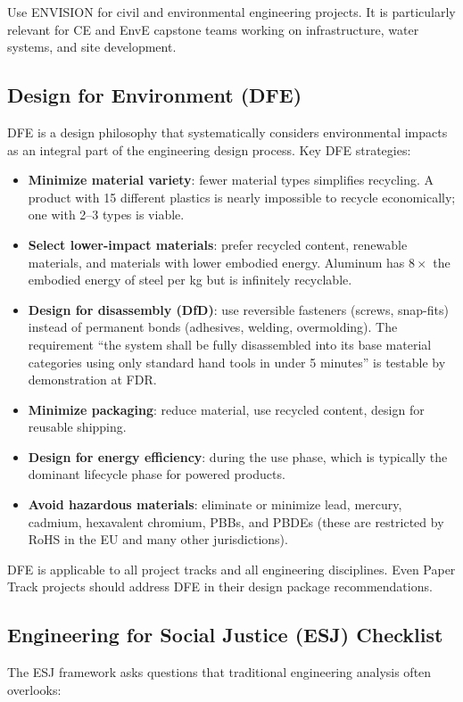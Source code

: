 Use ENVISION for civil and environmental engineering projects. It is particularly relevant for CE and EnvE capstone teams working on infrastructure, water systems, and site development.

\subsection{Design for Environment (DFE)}
DFE is a design philosophy that systematically considers environmental impacts as an integral part of the engineering design process. Key DFE strategies:

\begin{itemize}[nosep,leftmargin=1.5em]
\item \textbf{Minimize material variety}: fewer material types simplifies recycling. A product with 15 different plastics is nearly impossible to recycle economically; one with 2--3 types is viable.
\item \textbf{Select lower-impact materials}: prefer recycled content, renewable materials, and materials with lower embodied energy. Aluminum has $8\times$ the embodied energy of steel per kg but is infinitely recyclable.
\item \textbf{Design for disassembly (DfD)}: use reversible fasteners (screws, snap-fits) instead of permanent bonds (adhesives, welding, overmolding). The requirement ``the system shall be fully disassembled into its base material categories using only standard hand tools in under 5 minutes'' is testable by demonstration at FDR.
\item \textbf{Minimize packaging}: reduce material, use recycled content, design for reusable shipping.
\item \textbf{Design for energy efficiency}: during the use phase, which is typically the dominant lifecycle phase for powered products.
\item \textbf{Avoid hazardous materials}: eliminate or minimize lead, mercury, cadmium, hexavalent chromium, PBBs, and PBDEs (these are restricted by RoHS in the EU and many other jurisdictions).
\end{itemize}

DFE is applicable to all project tracks and all engineering disciplines. Even Paper Track projects should address DFE in their design package recommendations.

\subsection{Engineering for Social Justice (ESJ) Checklist}
The ESJ framework asks questions that traditional engineering analysis often overlooks:

